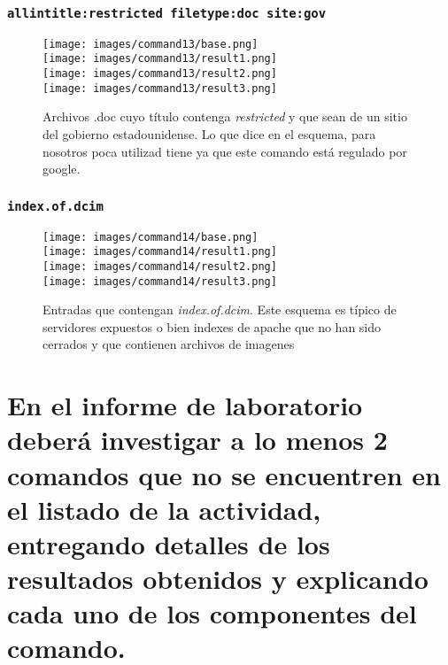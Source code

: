 \documentclass[11pt]{utalcaDoc}
\begin{document}
\subsubsection{\texttt{allintitle:restricted filetype:doc site:gov}}
\begin{figure}[H]
	\centering
\begin{multicols}{4}
	\texttt{[image: images/command13/base.png]}\\
	\texttt{[image: images/command13/result1.png]}\\
	\texttt{[image: images/command13/result2.png]}\\
	\texttt{[image: images/command13/result3.png]}\\
\end{multicols}
\caption{Archivos .doc cuyo título contenga \textit{restricted} y que sean de un sitio del gobierno estadounidense. Lo que dice en el esquema, para nosotros poca utilizad tiene ya que este comando está regulado por google.}
\label{FIG:command13}
\end{figure}



\subsubsection{\texttt{index.of.dcim}}
\begin{figure}[H]
	\centering
\begin{multicols}{4}
	\texttt{[image: images/command14/base.png]}\\
	\texttt{[image: images/command14/result1.png]}\\
	\texttt{[image: images/command14/result2.png]}\\
	\texttt{[image: images/command14/result3.png]}\\
\end{multicols}
\caption{Entradas que contengan \textit{index.of.dcim}. Este esquema es típico de servidores expuestos o bien indexes de apache que no han sido cerrados y que contienen archivos de imagenes}
\label{FIG:command14}
\end{figure}

\section{En el informe de laboratorio deberá investigar a lo menos 2 comandos que no se encuentren en el listado de la actividad, entregando detalles de los resultados obtenidos y explicando cada uno de los componentes del comando.}
\end{document}
